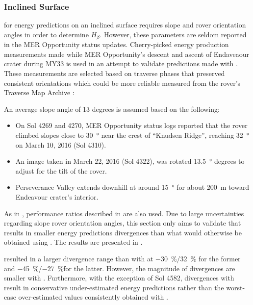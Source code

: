 \subsubsection{Inclined Surface}
\label{sec:PowerAndEnergyPredictions:Validation:InclinedSurface}

 for energy predictions on an inclined surface requires slope and rover orientation angles in order to determine $H_{\beta}$. However, these parameters are seldom reported in the \ac{MER} Opportunity status updates. Cherry-picked energy production measurements made while \ac{MER} Opportunity's descent and ascent of Endaveaour crater during \ac{MY}33 is used in an attempt to validate predictions made with . These measurements are selected based on traverse phases that preserved consistent orientations which could be more reliable measured from the rover's Traverse Map Archive :

An average slope angle of 13 degrees is assumed based on the following:
\begin{itemize}
  \item On Sol 4269 and 4270, \ac{MER} Opportunity status logs reported that the rover climbed slopes close to \SI{30}{\degree} near the crest of ``Knudsen Ridge'', reaching \SI{32}{\degree} on March 10, 2016 (Sol 4310).
  \item An image taken in March 22, 2016 (Sol 4322), was rotated \SI{13.5}{\degree} degrees to adjust for the tilt of the rover.
  \item Perseverance Valley extends downhill at around \SI{15}{\degree} for about \SI{200}{\meter} toward Endeavour crater's interior.
\end{itemize}

As in , performance ratios described in  are also used. Due to large uncertainties regarding slope rover orientation angles, this section only aims to validate that  results in smaller energy predictions divergences than what would otherwise be obtained using . The results are presented in .




 resulted in a larger divergence range than with  at \SI{-30}{\percent}/\SI{32}{\percent} for the former and \SI{-45}{\percent}/\SI{-27}{\percent}for the latter. However, the magnitude of divergences are smaller with . Furthermore, with the exception of Sol 4582, divergences with  result in conservative under-estimated energy predictions rather than the worst-case over-estimated values consistently obtained with .


